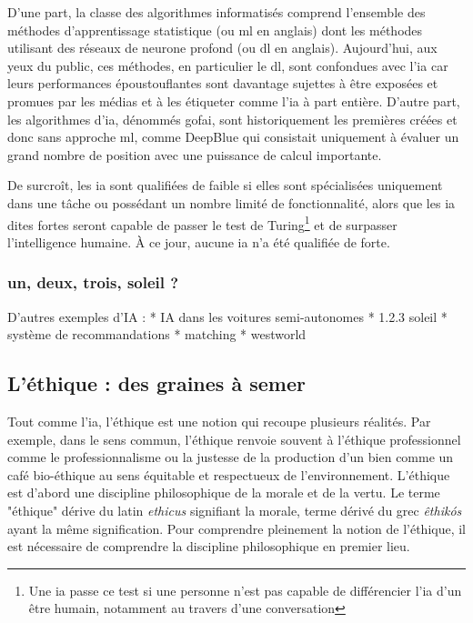 D'une part, la classe des algorithmes informatisés comprend l'ensemble des méthodes d'apprentissage statistique (ou \gls{ml} en anglais) dont les méthodes utilisant des réseaux de neurone profond (ou \gls{dl} en anglais). Aujourd'hui, aux yeux du public, ces méthodes, en particulier le \gls{dl}, sont confondues avec l'\gls{ia} car leurs performances époustouflantes sont davantage sujettes à être exposées et promues par les médias et à les étiqueter comme l'\gls{ia} à part entière. D'autre part, les algorithmes d'\gls{ia}, dénommés \gls{gofai}, sont historiquement les premières créées et donc sans approche \gls{ml}, comme DeepBlue qui consistait uniquement à évaluer un grand nombre de position avec une puissance de calcul importante.

De surcroît, les \gls{ia} sont qualifiées de faible si elles sont spécialisées uniquement dans une tâche ou possédant un nombre limité de fonctionnalité, alors que les \gls{ia} dites fortes seront capable de passer le test de Turing\footnote{Une \gls{ia} passe ce test si une personne n'est pas capable de différencier l'\gls{ia} d'un être humain, notamment au travers d'une conversation} et de surpasser l'intelligence humaine. À ce jour, aucune \gls{ia} n'a été qualifiée de forte.

\subsubsection{un, deux, trois, soleil ?}


D'autres exemples d'IA :
* IA dans les voitures semi-autonomes
* 1.2.3 soleil
* système de recommandations
* matching
* westworld




\subsection{L'éthique : des graines à semer}\label{subsection:ethique}

Tout comme l'\gls{ia}, l'éthique est une notion qui recoupe plusieurs réalités. Par exemple, dans le sens commun, l'éthique renvoie souvent à l'éthique professionnel comme le professionnalisme ou la justesse de la production d'un bien comme un café bio-éthique au sens équitable et respectueux de l'environnement.
L'éthique est d'abord une discipline philosophique de la morale et de la vertu. Le terme "éthique" dérive du latin \textit{ethicus} signifiant la morale, terme dérivé du grec \textit{êthikós} ayant la même signification. Pour comprendre pleinement la notion de l'éthique, il est nécessaire de comprendre la discipline philosophique en premier lieu.

